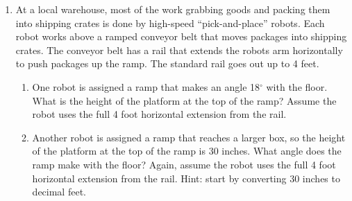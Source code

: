\begin{enumerate}
\hfill ~
    
 \begin{enumerate}
    \item Use the first triangle to evaluate $\sin(30^\circ)$, $\cos(30^\circ)$, and $\tan(30^\circ)$.  Write your answers as exact fractions (which might involve square roots) and give decimal approximations.  Hint: The side opposite to 30$^\circ$ has length 1 while the side adjacent to 30$^\circ$ has length $\sqrt{3}$.
    \item Use the first triangle again to evaluate $\sin(60^\circ)$, $\cos(60^\circ)$, and $
    \tan(60^\circ)$.  Write your answers as exact fractions (which might involve square roots) and give decimal approximations.  Caution: The side opposite to 60$^\circ$ has length $\sqrt{3}$ while the side adjacent to 60$^\circ$ has length 1. (Lesson learned: which leg is opposite and which leg is adjacent depends on which angle we are using.)
    \item Use the second triangle to evaluate $\sin(45^\circ)$, $\cos(45^\circ)$, and $\tan(45^\circ)$.  Write your answers as exact fractions (which might involve square roots) and give decimal approximations.  Hint: the side opposite to 45$^\circ$ and the side adjacent to 45$^\circ$ each are length 1.
\end{enumerate}

\item %
At a local warehouse, most of the work grabbing goods and packing them into shipping crates is done by high-speed ``pick-and-place'' robots.  Each robot works above a ramped conveyor belt that moves packages into shipping crates.  The conveyor belt has a rail that extends the robots arm horizontally to push packages up the ramp.  The standard rail goes out up to 4 feet.

\begin{enumerate}
    \item One robot is assigned a ramp that makes an angle 18$^\circ$ with the floor.  What is the height of the platform at the top of the ramp?  Assume the robot uses the full 4 foot horizontal extension from the rail.  
    \item Another robot is assigned a ramp that reaches a larger box, so the height of the platform at the top of the ramp is 30 inches.  What angle does the ramp make with the floor?  Again, assume the robot uses the full 4 foot horizontal extension from the rail.  Hint: start by converting 30 inches to decimal feet.
\end{enumerate}


\end{enumerate}
